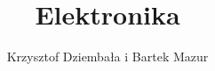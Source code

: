 %


\documentclass[a4paper,12pt, twoside]{article}
\usepackage{polski}
\usepackage[utf8]{inputenc}
\usepackage{listings}
\usepackage{graphicx}
\setlength\parindent{25pt}
\graphicspath{ {zdj/} }
\renewcommand*{\figurename}{Ilustracja} %
\usepackage{subcaption}
\usepackage[export]{adjustbox}
\usepackage{geometry}
\usepackage{titlesec}
\usepackage{fancyhdr}
\pagestyle{fancy}
\renewcommand{\sectionmark}[1]{\markright{#1}}%
\fancyfoot[LE,RO]{\thepage}%
\let\oldsection\section%
\renewcommand\section{\clearpage\oldsection}%
\renewcommand{\subsectionmark}[1]{}%

\chead{\fancyplain{}{\rightmark }} %
\cfoot{\fancyplain{}{}} %
\lhead{\fancyplain{}{}} %
\title{Elektronika}
\author{Krzysztof Dziembała i Bartek Mazur}



\maketitle



